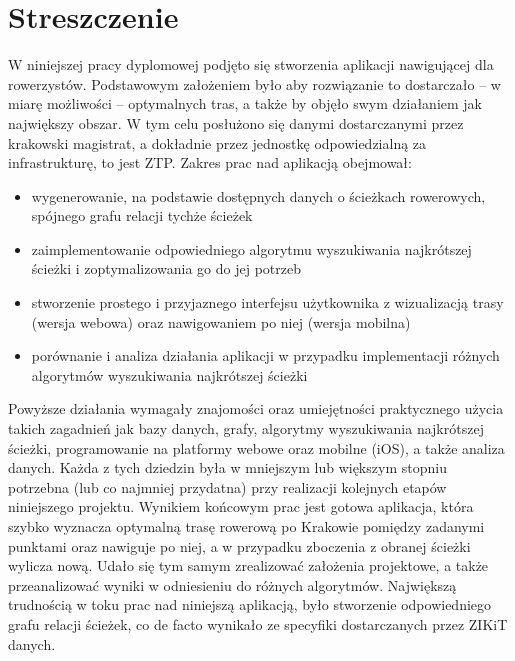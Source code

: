 \chapter{Streszczenie}
\label{cha:streszczenie}

W niniejszej pracy dyplomowej podjęto się stworzenia aplikacji nawigującej dla rowerzystów. Podstawowym założeniem było aby rozwiązanie to dostarczało – w miarę możliwości – optymalnych tras, a także by objęło swym działaniem jak największy obszar. W tym celu posłużono się danymi dostarczanymi przez krakowski magistrat, a dokładnie przez jednostkę odpowiedzialną za infrastrukturę, to jest ZTP. 
Zakres prac nad aplikacją obejmował:
\begin{itemize}
\item wygenerowanie, na podstawie dostępnych danych o ścieżkach rowerowych, spójnego grafu relacji tychże ścieżek
\item zaimplementowanie odpowiedniego algorytmu wyszukiwania najkrótszej ścieżki i zoptymalizowania go do jej potrzeb
\item stworzenie prostego i przyjaznego interfejsu użytkownika z wizualizacją trasy (wersja webowa) oraz nawigowaniem po niej (wersja mobilna)
\item porównanie i analiza działania aplikacji w przypadku implementacji różnych algorytmów wyszukiwania najkrótszej ścieżki
\end{itemize}
Powyższe działania wymagały znajomości oraz umiejętności praktycznego użycia takich zagadnień jak bazy danych, grafy, algorytmy wyszukiwania najkrótszej ścieżki, programowanie na platformy webowe oraz mobilne (iOS), a także analiza danych. Każda z tych dziedzin była w mniejszym lub większym stopniu potrzebna (lub co najmniej przydatna) przy realizacji kolejnych etapów niniejszego projektu.
Wynikiem końcowym prac jest gotowa aplikacja, która szybko wyznacza optymalną trasę rowerową po Krakowie pomiędzy zadanymi punktami oraz nawiguje po niej, a w przypadku zboczenia z obranej ścieżki wylicza nową. Udało się tym samym zrealizować założenia projektowe, a także przeanalizować wyniki w odniesieniu do różnych algorytmów.
Największą trudnością w toku prac nad niniejszą aplikacją, było stworzenie odpowiedniego grafu relacji ścieżek, co de facto wynikało ze specyfiki dostarczanych przez ZIKiT danych.